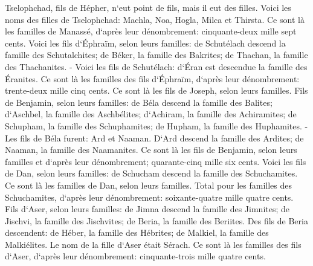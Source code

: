 \verse Tselophchad, fils de Hépher, n`eut point de fils, mais il eut des filles. Voici les noms des filles de Tselophchad: Machla, Noa, Hogla, Milca et Thirsta. 
\verse Ce sont là les familles de Manassé, d`après leur dénombrement: cinquante-deux mille sept cents. 
\verse Voici les fils d`Éphraïm, selon leurs familles: de Schutélach descend la famille des Schutalchites; de Béker, la famille des Bakrites; de Thachan, la famille des Thachanites. - 
\verse Voici les fils de Schutélach: d`Éran est descendue la famille des Éranites. 
\verse Ce sont là les familles des fils d`Éphraïm, d`après leur dénombrement: trente-deux mille cinq cents. Ce sont là les fils de Joseph, selon leurs familles. 
\verse Fils de Benjamin, selon leurs familles: de Béla descend la famille des Balites; d`Aschbel, la famille des Aschbélites; d`Achiram, la famille des Achiramites; 
\verse de Schupham, la famille des Schuphamites; de Hupham, la famille des Huphamites. - 
\verse Les fils de Béla furent: Ard et Naaman. D`Ard descend la famille des Ardites; de Naaman, la famille des Naamanites. 
\verse Ce sont là les fils de Benjamin, selon leurs familles et d`après leur dénombrement; quarante-cinq mille six cents. 
\verse Voici les fils de Dan, selon leurs familles: de Schucham descend la famille des Schuchamites. Ce sont là les familles de Dan, selon leurs familles. 
\verse Total pour les familles des Schuchamites, d`après leur dénombrement: soixante-quatre mille quatre cents. 
\verse Fils d`Aser, selon leurs familles: de Jimna descend la famille des Jimnites; de Jischvi, la famille des Jischvites; de Beria, la famille des Beriites. 
\verse Des fils de Beria descendent: de Héber, la famille des Hébrites; de Malkiel, la famille des Malkiélites. 
\verse Le nom de la fille d`Aser était Sérach. 
\verse Ce sont là les familles des fils d`Aser, d`après leur dénombrement: cinquante-trois mille quatre cents. 
